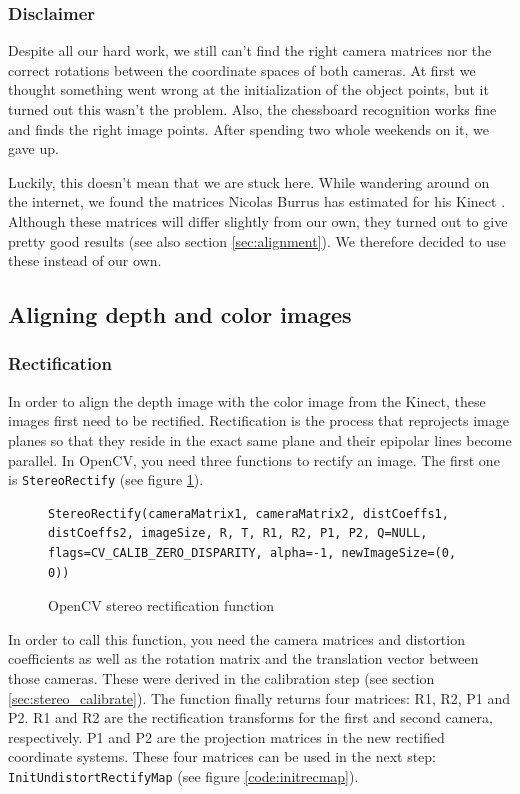 \subsubsection{Disclaimer}
Despite all our hard work, we still can't find the right camera matrices nor the correct rotations between the coordinate spaces of both cameras. At first we thought something went wrong at the initialization of the object points, but it turned out this wasn't the problem. Also, the chessboard recognition works fine and finds the right image points. After spending two whole weekends on it, we gave up.

Luckily, this doesn't mean that we are stuck here. While wandering around on the internet, we found the matrices Nicolas Burrus has estimated for his Kinect \cite{RGBDEMO}. Although these matrices will differ slightly from our own, they turned out to give pretty good results (see also section \ref{sec:alignment}). We therefore decided to use these instead of our own.


\subsection{Aligning depth and color images}

\subsubsection{Rectification}
In order to align the depth image with the color image from the Kinect, these images first need to be rectified. Rectification is the process that reprojects image planes so that they reside in
the exact same plane and their epipolar lines become parallel. In OpenCV, you need three functions to rectify an image. The first one is \verb|StereoRectify| (see figure \ref{code:stereorectify}).

\begin{figure}[H]
\begin{lstlisting}
StereoRectify(cameraMatrix1, cameraMatrix2, distCoeffs1, distCoeffs2, imageSize, R, T, R1, R2, P1, P2, Q=NULL, flags=CV_CALIB_ZERO_DISPARITY, alpha=-1, newImageSize=(0, 0))
\end{lstlisting}
\caption{OpenCV stereo rectification function}
\label{code:stereorectify}
\end{figure}

In order to call this function, you need the camera matrices and distortion coefficients as well as the rotation matrix and the translation vector between those cameras. These were derived in the calibration step (see section \ref{sec:stereo_calibrate}). The function finally returns four matrices: R1, R2, P1 and P2. R1 and R2 are the rectification transforms for the first and second camera, respectively. P1 and P2 are the projection matrices in the new rectified coordinate systems. These four matrices can be used in the next step: \verb|InitUndistortRectifyMap| (see figure \ref{code:initrecmap}).

